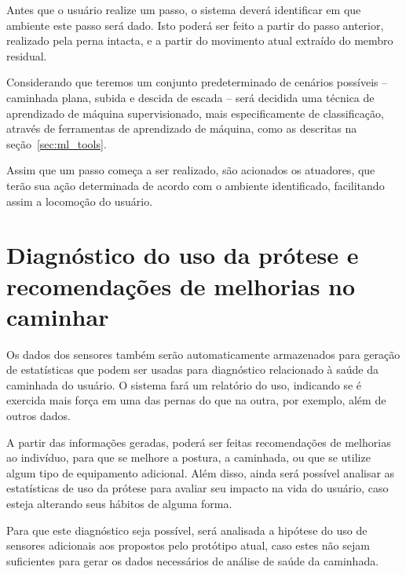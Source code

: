 Antes que o usuário realize um passo, o sistema deverá identificar em que ambiente este passo será dado. Isto poderá ser feito a partir do passo anterior, realizado pela perna intacta, e a partir do movimento atual extraído do membro residual.

Considerando que teremos um conjunto predeterminado de cenários possíveis -- caminhada plana, subida e descida de escada -- será decidida uma técnica de aprendizado de máquina supervisionado, mais especificamente de classificação, através de ferramentas de aprendizado de máquina, como as descritas na seção~\ref{sec:ml_tools}.

Assim que um passo começa a ser realizado, são acionados os atuadores, que terão sua ação determinada de acordo com o ambiente identificado, facilitando assim a locomoção do usuário.

\section{Diagnóstico do uso da prótese e recomendações de melhorias no caminhar}
Os dados dos sensores também serão automaticamente armazenados para geração de estatísticas que podem ser usadas para diagnóstico relacionado à saúde da caminhada do usuário. O sistema fará um relatório do uso, indicando se é exercida mais força em uma das pernas do que na outra, por exemplo, além de outros dados.

A partir das informações geradas, poderá ser feitas recomendações de melhorias ao indivíduo, para que se melhore a postura, a caminhada, ou que se utilize algum tipo de equipamento adicional. Além disso, ainda será possível analisar as estatísticas de uso da prótese para avaliar seu impacto na vida do usuário, caso esteja alterando seus hábitos de alguma forma.

Para que este diagnóstico seja possível, será analisada a hipótese do uso de sensores adicionais aos propostos pelo protótipo atual, caso estes não sejam suficientes para gerar os dados necessários de análise de saúde da caminhada.
